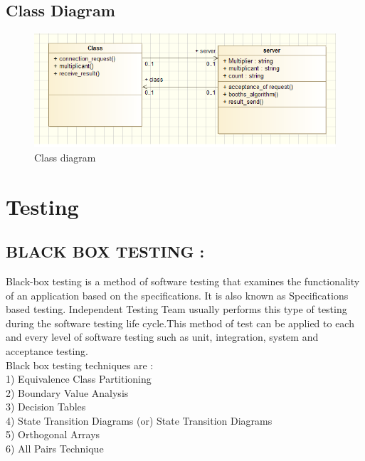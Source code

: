 \documentclass[a4paper,12pt]{article}
\begin{document}
\subsection{Class Diagram}

\begin{figure}[h!]
			\centering
			\includegraphics[scale=0.95]{class}
			\caption{Class diagram}
			\label{Class diagram}
		\end{figure}

\newpage

\section{Testing}
\subsection{BLACK BOX TESTING : }
		 Black-box testing is a method of software testing that examines the functionality of an application based on the specifications. It is also known as Specifications based testing. Independent Testing Team usually performs this type of testing during the software testing life cycle.This method of test can be applied to each and every level of software testing such as unit, integration, system and acceptance testing.\\
		 Black box testing techniques are :\\
1) Equivalence Class Partitioning\\
2) Boundary Value Analysis\\
3) Decision Tables\\
4) State Transition Diagrams (or) State Transition Diagrams\\
5) Orthogonal Arrays\\
6) All Pairs Technique\\
\end{document}
